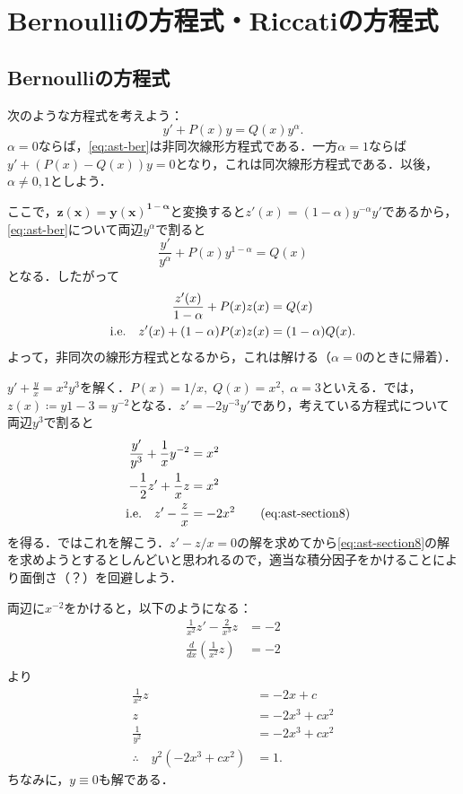 \section{Bernoulliの方程式・Riccatiの方程式} %
\subsection{Bernoulliの方程式}
次のような方程式を考えよう：
\begin{equation}
    y' + P(x)y = Q(x)y^{\alpha}. \label{eq:ast-ber}
\end{equation}
$\alpha=0$ならば，\eqref{eq:ast-ber}は非同次線形方程式である．一方$\alpha = 1$ならば$y'+(P(x)-Q(x))y=0$となり，これは同次線形方程式である．以後，$\alpha \neq 0, 1$としよう．

ここで，$\bm{z(x)=y(x)^{1-\alpha}}$と変換すると$z'(x)=(1-\alpha)y^{-\alpha}y'$であるから，\eqref{eq:ast-ber}について両辺$y^{\alpha}$で割ると
\[ \frac{y'}{y^{\alpha}} + P(x)y^{1-\alpha} = Q(x)\]
となる．したがって
\begin{align*}
    \frac{z'(x)}{1-\alpha} + P(x)z(x) &= Q(x) \\
    \text{i.e.} \quad z'(x) + (1-\alpha)P(x)z(x) &= (1-\alpha)Q(x).
\end{align*}
よって，非同次の線形方程式となるから，これは解ける（$\alpha=0$のときに帰着）．

\begin{example} \label{example:ber}
    $\displaystyle y'+\frac{y}{x} = x^2y^3$を解く．$P(x) = 1/x, \; Q(x) = x^2, \; \alpha=3$といえる．では，$z(x) \coloneqq y{1-3} = y^{-2}$となる．$z'=-2y^{-3}y'$であり，考えている方程式について両辺$y^3$で割ると
    \begin{align*}
        \frac{y'}{y^3} + \frac{1}{x}y^{-2} &= x^2 \\
        \quad -\frac{1}{2}z' + \frac{1}{x}z &= x^2 \\
        \text{i.e.} \quad z'-\frac{z}{x} &= -2x^2 \tag{eq:ast-section8}
    \end{align*}
    を得る．ではこれを解こう．$z'-z/x= 0$の解を求めてから\eqref{eq:ast-section8}の解を求めようとするとしんどいと思われるので，適当な積分因子をかけることにより面倒さ（？）を回避しよう．

    両辺に$x^{-2}$をかけると，以下のようになる：
    \begin{align*}
        \frac{1}{x^2}z' - \frac{2}{x^3}z &= -2 \\
        \frac{d}{dx}\left(\frac{1}{x^2}z\right) &= -2 \\
    \end{align*}
    より
    \begin{align*}
        \frac{1}{x^2}z &= -2x + c \\
        z &= -2x^3+cx^2 \\
        \frac{1}{y^2} &=  -2x^3+cx^2 \\
        \therefore \quad y^2(-2x^3+cx^2) &= 1.
    \end{align*}
    ちなみに，$y \equiv 0$も解である．
\end{example}

